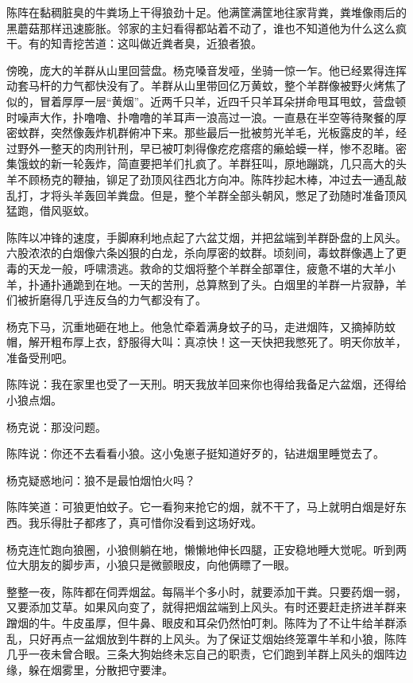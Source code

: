 \par 陈阵在黏稠脏臭的牛粪场上干得狼劲十足。他满筐满筐地往家背粪，粪堆像雨后的黑蘑菇那样迅速膨胀。邻家的主妇看得都站着不动了，谁也不知道他为什么这么疯干。有的知青挖苦道：这叫做近粪者臭，近狼者狼。
\par 
\par 傍晚，庞大的羊群从山里回营盘。杨克嗓音发哑，坐骑一惊一乍。他已经累得连挥动套马杆的力气都快没有了。羊群从山里带回亿万黄蚊，整个羊群像被野火烤焦了似的，冒着厚厚一层“黄烟”。近两千只羊，近四千只羊耳朵拼命甩耳甩蚊，营盘顿时噪声大作，扑噜噜、扑噜噜的羊耳声一浪高过一浪。一直悬在半空等待聚餐的厚密蚊群，突然像轰炸机群俯冲下来。那些最后一批被剪光羊毛，光板露皮的羊，经过野外一整天的肉刑针刑，早已被叮刺得像疙疙瘩瘩的癞蛤蟆一样，惨不忍睹。密集饿蚊的新一轮轰炸，简直要把羊们扎疯了。羊群狂叫，原地蹦跳，几只高大的头羊不顾杨克的鞭抽，铆足了劲顶风往西北方向冲。陈阵抄起木棒，冲过去一通乱敲乱打，才将头羊轰回羊粪盘。但是，整个羊群全部头朝风，憋足了劲随时准备顶风猛跑，借风驱蚊。
\par 陈阵以冲锋的速度，手脚麻利地点起了六盆艾烟，并把盆端到羊群卧盘的上风头。六股浓浓的白烟像六条凶狠的白龙，杀向厚密的蚊群。顷刻间，毒蚊群像遇上了更毒的天龙一般，呼啸溃逃。救命的艾烟将整个羊群全部罩住，疲惫不堪的大羊小羊，扑通扑通跪到在地。一天的苦刑，总算熬到了头。白烟里的羊群一片寂静，羊们被折磨得几乎连反刍的力气都没有了。
\par 杨克下马，沉重地砸在地上。他急忙牵着满身蚊子的马，走进烟阵，又摘掉防蚊帽，解开粗布厚上衣，舒服得大叫：真凉快！这一天快把我憋死了。明天你放羊，准备受刑吧。
\par 陈阵说：我在家里也受了一天刑。明天我放羊回来你也得给我备足六盆烟，还得给小狼点烟。
\par 杨克说：那没问题。
\par 陈阵说：你还不去看看小狼。这小兔崽子挺知道好歹的，钻进烟里睡觉去了。
\par 杨克疑惑地问：狼不是最怕烟怕火吗？
\par 陈阵笑道：可狼更怕蚊子。它一看狗来抢它的烟，就不干了，马上就明白烟是好东西。我乐得肚子都疼了，真可惜你没看到这场好戏。
\par 杨克连忙跑向狼圈，小狼侧躺在地，懒懒地伸长四腿，正安稳地睡大觉呢。听到两位大朋友的脚步声，小狼只是微颤眼皮，向他俩瞟了一眼。
\par 整整一夜，陈阵都在伺弄烟盆。每隔半个多小时，就要添加干粪。只要药烟一弱，又要添加艾草。如果风向变了，就得把烟盆端到上风头。有时还要赶走挤进羊群来蹭烟的牛。牛皮虽厚，但牛鼻、眼皮和耳朵仍然怕叮刺。陈阵为了不让牛给羊群添乱，只好再点一盆烟放到牛群的上风头。为了保证艾烟始终笼罩牛羊和小狼，陈阵几乎一夜未曾合眼。三条大狗始终未忘自己的职责，它们跑到羊群上风头的烟阵边缘，躲在烟雾里，分散把守要津。
